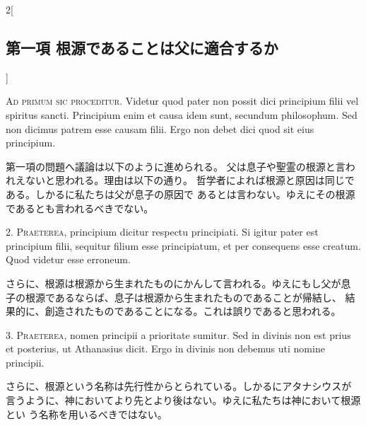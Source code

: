 \documentclass[paper=a4paper,fontsize=10pt,jafontsize=9pt,titlepage]{jlreq}
\begin{document}
\begin{paracol}{2}[\subsection{第一項 根源であることは父に適合するか}]

{\scshape Ad primum sic proceditur}. Videtur quod pater non possit dici
principium filii vel spiritus sancti. Principium enim et causa idem
sunt, secundum philosophum. Sed non dicimus patrem esse causam
filii. Ergo non debet dici quod sit eius principium.


\switchcolumn


第一項の問題へ議論は以下のように進められる。
父は息子や聖霊の根源と言われえないと思われる。理由は以下の通り。
哲学者によれば根源と原因は同じである。しかるに私たちは父が息子の原因で
 あるとは言わない。ゆえにその根源であるとも言われるべきでない。




2. {\scshape Praeterea}, principium dicitur respectu principiati. Si igitur pater
est principium filii, sequitur filium esse principiatum, et per
consequens esse creatum. Quod videtur esse erroneum.


\switchcolumn


さらに、根源は根源から生まれたものにかんして言われる。ゆえにもし父が息
 子の根源であるならば、息子は根源から生まれたものであることが帰結し、
 結果的に、創造されたものであることになる。これは誤りであると思われる。




3. {\scshape Praeterea}, nomen principii a prioritate sumitur. Sed in divinis non
est prius et posterius, ut Athanasius dicit. Ergo in divinis non
debemus uti nomine principii.


\switchcolumn


さらに、根源という名称は先行性からとられている。しかるにアタナシウスが
 言うように、神においてより先とより後はない。ゆえに私たちは神において根源とい
 う名称を用いるべきではない。


\switchcolumn*[\subsection{s.c.}]



\end{paracol}
\end{document}
